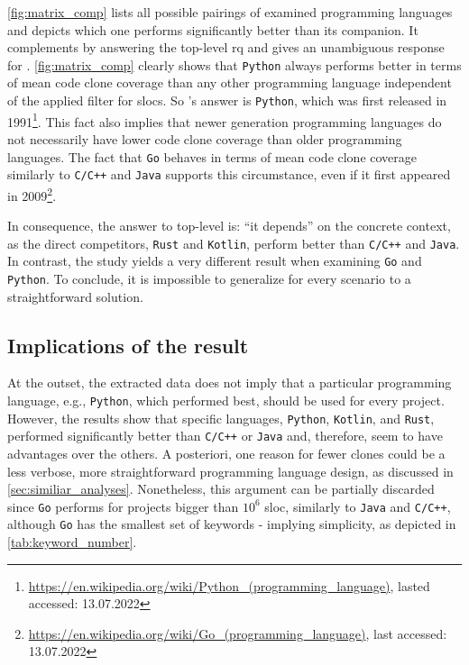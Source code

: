 \autoref{fig:matrix_comp} lists all possible pairings of examined programming languages and depicts which one performs significantly better than its companion. It complements  by answering the top-level \ac{rq} and gives an unambiguous response for .
\autoref{fig:matrix_comp} clearly shows that \texttt{Python} always performs better in terms of mean code clone coverage than any other programming language independent of the applied filter for \aclp{sloc}. So 's answer is \texttt{Python}, which was first released in 1991\footnote{\url{https://en.wikipedia.org/wiki/Python_(programming_language)}, lasted accessed: 13.07.2022}.
This fact also implies that newer generation programming languages do not necessarily have lower code clone coverage than older programming languages. The fact that \texttt{Go} behaves in terms of mean code clone coverage similarly to \texttt{C/C++} and \texttt{Java} supports this circumstance, even if it first appeared in 2009\footnote{\url{https://en.wikipedia.org/wiki/Go_(programming_language)}, last accessed: 13.07.2022}.

In consequence, the answer to top-level  is: ``it depends'' on the concrete context, as the direct competitors, \texttt{Rust} and \texttt{Kotlin}, perform better than \texttt{C/C++} and \texttt{Java}. In contrast, the study yields a very different result when examining \texttt{Go} and \texttt{Python}. To conclude, it is impossible to generalize  for every scenario to a straightforward solution.

\subsection{Implications of the result}


At the outset, the extracted data does not imply that a particular programming language, e.g., \texttt{Python}, which performed best, should be used for every project. 
However, the results show that specific languages, \texttt{Python}, \texttt{Kotlin}, and \texttt{Rust}, performed significantly better than \texttt{C/C++} or \texttt{Java} and, therefore, seem to have advantages over the others.
A posteriori, one reason for fewer clones could be a less verbose, more straightforward programming language design, as discussed in \autoref{sec:similiar_analyses}.
Nonetheless, this argument can be partially discarded since \texttt{Go} performs for projects bigger than $10^6$ \ac{sloc}, similarly to \texttt{Java} and \texttt{C/C++}, although \texttt{Go} has the smallest set of keywords - implying simplicity, as depicted in \autoref{tab:keyword_number}.

